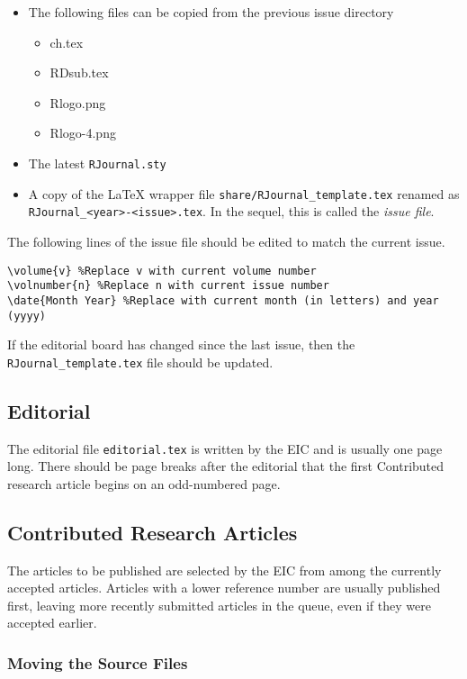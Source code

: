 \documentclass[11pt]{article}
\begin{document}
\begin{itemize}
\item The following files can be copied from the previous issue directory
\begin{itemize}
\item ch.tex
\item RDsub.tex
\item Rlogo.png
\item Rlogo-4.png
\end{itemize}
\item The latest \texttt{RJournal.sty}
\item A copy of the LaTeX wrapper file
  \texttt{share/RJournal\_template.tex} renamed as\\
  \texttt{RJournal\_<year>-<issue>.tex}. In the sequel, this is called
  the {\em issue file}.
\end{itemize}

The following lines of the issue file should be edited to match the
current issue.
{\small
\begin{verbatim}
\volume{v} %Replace v with current volume number
\volnumber{n} %Replace n with current issue number
\date{Month Year} %Replace with current month (in letters) and year (yyyy)
\end{verbatim}
}

If the editorial board has changed since the last issue, then the
\verb+RJournal_template.tex+ file should be updated.

\subsection{Editorial}

The editorial file \texttt{editorial.tex} is written by the EIC and is
usually one page long.  There should be page breaks after the
editorial that the first Contributed research article begins on an
odd-numbered page.

\subsection{Contributed Research Articles}

The articles to be published are selected by the EIC from among the
currently accepted articles. Articles with a lower reference number
are usually published first, leaving more recently submitted articles
in the queue, even if they were accepted earlier.

\subsubsection{Moving the Source Files}
\end{document}
